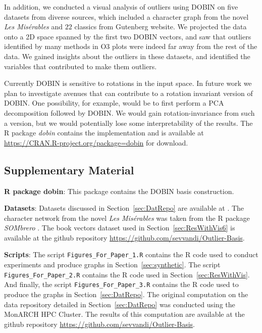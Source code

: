 \documentclass[letter,12pt]{article}
\begin{document}
In addition, we conducted a visual analysis of outliers using DOBIN on five datasets from diverse sources, which included a character graph from the novel \textit{Les Mis\'erables} and $22$ classics from Gutenberg website. We projected the data onto a 2D space spanned by the first two DOBIN vectors, and saw that outliers identified by many methods in O3 plots were indeed far away from the rest of the data. We gained insights about the outliers in these datasets, and identified the variables that contributed to make them outliers.


Currently DOBIN is sensitive to rotations in the input space. In future work we plan to investigate avenues that can contribute to a rotation invariant version of DOBIN. One possibility, for example, would be to first perform a PCA decomposition followed by DOBIN. We would gain rotation-invariance from such a version, but we would potentially lose some interpretability of the results. The R package \textit{dobin} contains the implementation and is available at \url{https://CRAN.R-project.org/package=dobin} for download.

\clearpage

\subsection*{Supplementary Material}

\textbf{R package dobin}: This package contains the DOBIN basis construction.

\textbf{Datasets}: Datasets discussed in Section~\ref{sec:DatRepo} are available at \cite{datasets}. The character network from the novel \textit{Les Mis\'erables} was taken from the R package \textit{SOMbrero} \citep{sombrero}. The book vectors dataset used in Section~\ref{sec:ResWithVis6} is available at the github repository \url{https://github.com/sevvandi/Outlier-Basis}.

\textbf{Scripts}: The script \texttt{Figures\_For\_Paper\_1.R} contains the R code used to conduct experiments and produce graphs in Section~\ref{sec:synthetic}. The script \texttt{Figures\_For\_Paper\_2.R} contains the R code used in Section~\ref{sec:ResWithVis}. And finally, the script \texttt{Figures\_For\_Paper\_3.R} contains the R code used to produce the graphs in Section~\ref{sec:DatRepo}. The original computation on the data repository detailed in Section~\ref{sec:DatRepo} was conducted using the MonARCH HPC Cluster. The results of this computation are available at the github repository \url{https://github.com/sevvandi/Outlier-Basis}.
\end{document}
